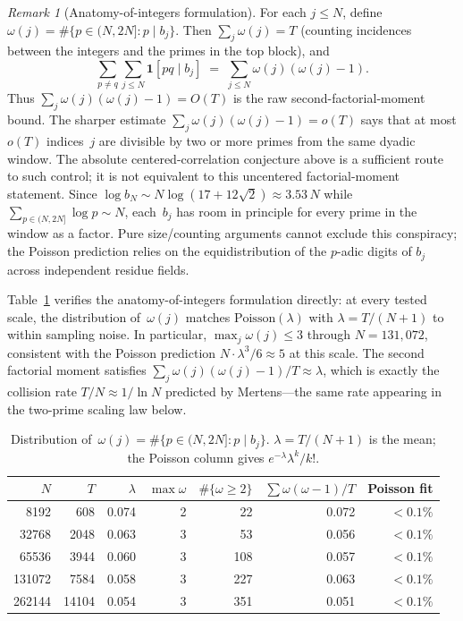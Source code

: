 \documentclass[11pt]{article}
\theoremstyle{definition}
\theoremstyle{remark}
\newtheorem{remark}[theorem]{Remark}
\begin{document}
\begin{remark}[Anatomy-of-integers formulation]
\label{rem:anatomy}
For each $j \le N$, define
$\omega(j) = \#\{p \in (N, 2N] : p \mid b_j\}$.
Then $\sum_j \omega(j) = T$
(counting incidences between the integers and the primes
in the top block), and
\[
\sum_{p \ne q} \!\sum_{j \le N}\!
\mathbf{1}[pq \mid b_j]
\;=\; \sum_{j \le N}\omega(j)(\omega(j)-1).
\]
Thus $\sum_j \omega(j)(\omega(j){-}1)=O(T)$ is the raw
second-factorial-moment bound.  The sharper estimate
$\sum_j \omega(j)(\omega(j){-}1)=o(T)$ says that
at most $o(T)$ indices~$j$ are
divisible by two or more primes
from the same dyadic window.
The absolute centered-correlation conjecture above is a
sufficient route to such control; it is not equivalent to this
uncentered factorial-moment statement.
Since $\log b_N \sim N\log(17 + 12\sqrt{2})
\approx 3.53\,N$ while
$\sum_{p \in (N,2N]} \log p \sim N$,
each~$b_j$ has room in principle
for every prime in the window as a factor.
Pure size/counting arguments cannot
exclude this conspiracy; the Poisson
prediction relies on the equidistribution
of the $p$-adic digits of $b_j$
across independent residue fields.
\end{remark}

\noindent
Table~\ref{tab:omega-dist} verifies the
anatomy-of-integers formulation directly:
at every tested scale, the distribution
of~$\omega(j)$ matches
$\mathrm{Poisson}(\lambda)$ with
$\lambda = T/(N{+}1)$
to within sampling noise.
In particular, $\max_j \omega(j) \le 3$
through $N = 131{,}072$, consistent with
the Poisson prediction
$N \cdot \lambda^3\!/6 \approx 5$
at this scale.
The second factorial moment satisfies
$\sum_j \omega(j)(\omega(j){-}1)/T
\approx \lambda$,
which is exactly the collision rate
$T/N \approx 1/\!\ln N$ predicted by
Mertens---the same rate appearing in
the two-prime scaling law below.

\begin{table}[ht]
\centering\small
\caption{Distribution of~$\omega(j)
= \#\{p \in (N,2N] : p \mid b_j\}$.
$\lambda = T/(N{+}1)$ is the mean;
the Poisson column gives
$e^{-\lambda}\lambda^k/k!$.}
\label{tab:omega-dist}
\begin{tabular}{rrrrrrr}
\toprule
$N$ & $T$ & $\lambda$ &
$\max\omega$ &
$\#\{\omega{\ge}2\}$ &
$\sum\omega(\omega{-}1)/T$ &
Poisson fit \\
\midrule
8192 & 608 & 0.074
& 2 & 22 & 0.072
& $<0.1\%$ \\
32768 & 2048 & 0.063
& 3 & 53 & 0.056
& $<0.1\%$ \\
65536 & 3944 & 0.060
& 3 & 108 & 0.057
& $<0.1\%$ \\
131072 & 7584 & 0.058
& 3 & 227 & 0.063
& $<0.1\%$ \\
262144 & 14104 & 0.054
& 3 & 351 & 0.051
& $<0.1\%$ \\
\bottomrule
\end{tabular}
\end{table}
\end{document}
